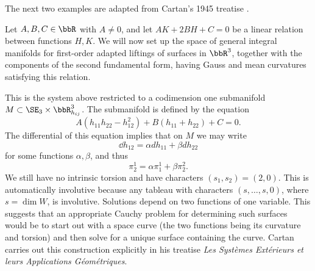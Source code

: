 The next two examples are adapted from Cartan's 1945 treatise \cite{cartan45}.
\begin{example}\label{ex Weingarten surfaces}
    Let $A,B,C\in\bbR$ with $A\neq 0$, and let $AK+2BH+C=0$ be a linear relation between functions $H,K$. We will now set up the space of general integral manifolds for first-order adapted liftings of surfaces in $\bbR^3$, together with the components of the second fundamental form, having Gauss and mean curvatures satisfying this relation.

    This is the system above restricted to a codimension one submanifold $M\subset \SE_3\times \bbR^3_{h_{ij}}$. The submanifold is defined by the equation 
    \[A(h_{11}h_{22}-h_{12}^2)+B(h_{11}+h_{22})+C=0.\]
    The differential of this equation implies that on $M$ we may write 
    \[\dd h_{12}=\alpha d h_{11}+\beta dh_{22}\]
    for some functions $\alpha,\beta$, and thus 
    \[\pi^1_2=\alpha\pi^1_1+\beta\pi^2_2.\]
    We still have no intrinsic torsion and have characters $(s_1,s_2)=(2,0)$.  This is automatically involutive because any tableau with characters $(s,\ldots,s,0)$, where $s=\dim W$, is involutive. Solutions depend on two functions of one variable. This suggests that an appropriate Cauchy problem for determining such surfaces would be to start out with a space curve (the two functions being its curvature and torsion) and then solve for a unique surface containing the curve. Cartan carries out this construction explicitly in his treatise \emph{Les Syst\`emes Ext\'erieurs et leurs Applications G\'eom\'etriques}.
\end{example} 

